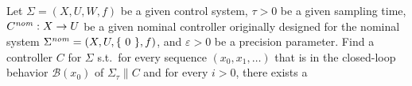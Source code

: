 \begin{problem}
	Let $\Sigma=(X,U,W,f)$ be a given control system, $\tau>0$ be a given sampling time, $C^{\mathit{nom}}:X\rightarrow U$ be a given nominal controller originally designed for the nominal system $\Sigma^{\mathit{nom}}=(X,U,\lbrace~0~\rbrace,f)$, and $\varepsilon>0$ be a precision parameter.
	Find a controller $C$ for $\Sigma$ s.t.\ for every sequence $(x_0,x_1,\ldots)$ that is in the closed-loop behavior $\mathcal{B}(x_0)$ of $\Sigma_\tau\parallel C$ and for every $i > 0$, there exists a 
\end{problem}